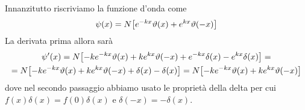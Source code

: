\begin{soluzione}
   Innanzitutto riscriviamo la funzione d'onda come
   \begin{equation*}
      \psi(x)=N\qty[ e^{-kx}\vartheta(x) +
      e^{kx}\vartheta(-x) ]
   \end{equation*}
   La derivata prima allora sarà
   \begin{gather*}
      \psi'(x)
      =N\qty[ -ke^{-kx}\vartheta(x) +
      ke^{kx}\vartheta(-x) + e^{-kx}\delta(x) - e^{kx}\delta(x) ]=
      \\
      =N\qty[ -ke^{-kx}\vartheta(x) + ke^{kx}\vartheta(-x) + \delta(x) - \delta(x) ]
      =N\qty[ -ke^{-kx}\vartheta(x) + ke^{kx}\vartheta(-x) ]
   \end{gather*}
   dove nel secondo passaggio abbiamo usato le proprietà della delta per cui $f(x)\delta(x)=f(0)\delta(x)$ e $\delta(-x)=-\delta(x)$.
   

\end{soluzione}
